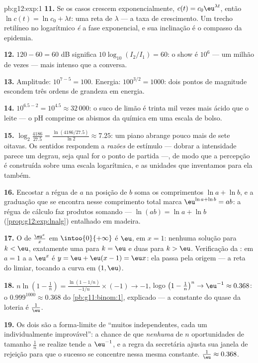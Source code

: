 \begin{solution}{pb:g12:exp:1}
\textbf{11.} Se os casos crescem exponencialmente,
$c(t) = c_0 \eu^{\lambda t}$, então
$\ln c(t) = \ln c_0 + \lambda t$: uma reta de  $\lambda$ --- a taxa de crescimento. Um trecho retilíneo
no  logarítmico \emph{é} a fase exponencial, e sua
inclinação é o compasso da epidemia.

\textbf{12.} $120 - 60 = 60$ dB significa
$10\log_{10}(I_2/I_1) = 60$: o show é $10^6$ --- um milhão de
vezes --- mais intenso que a conversa.

\textbf{13.} Amplitude: $10^{7-5} = 100$. Energia:
$100^{3/2} = 1000$: dois pontos de magnitude escondem três
ordens de grandeza em energia.

\textbf{14.} $10^{6.5 - 2} = 10^{4.5} \approx 32\,000$: o suco
de limão é trinta mil vezes mais ácido que o leite --- o pH
comprime os abismos da química em uma escala de bolso.

\textbf{15.} $\log_2\!\frac{4186}{27.5} =
\frac{\ln(4186/27.5)}{\ln 2} \approx 7.25$: um piano abrange
pouco mais de sete oitavas. Os sentidos respondem a
\emph{razões} de estímulo --- dobrar a intensidade parece um
degrau, seja qual for o ponto de partida ---, de modo que a
percepção é construída sobre uma escala logarítmica, e as
unidades que inventamos para ela também.

\textbf{16.} Encostar a régua de $a$ na posição de $b$ soma os
comprimentos $\ln a + \ln b$, e a graduação que se encontra
nesse comprimento total marca
$\eu^{\ln a + \ln b} = ab$: a régua de cálculo faz produtos
somando  --- $\ln(ab) = \ln a + \ln b$
(\cref{prop:g12:exp:lnalg}) entalhado em madeira.

\textbf{17.} O  de $\frac{\eu^x}{x}$ em
$\intoo{0}{+\infty}$ é $\eu$, em $x = 1$: nenhuma solução para
$k < \eu$, exatamente uma para $k = \eu$ e duas para
$k > \eu$. Verificação da : em $a = 1$ a  a
$\eu^x$ é $y = \eu + \eu(x - 1) = \eu x$: ela passa pela origem
--- a reta do limiar, tocando a curva em $(1, \eu)$.

\textbf{18.} $n \ln\!\left(1 - \frac1n\right) =
\frac{\ln(1 - 1/n)}{-1/n} \times (-1) \to -1$, logo
$\left(1 - \frac1n\right)^n \to \eu^{-1} \approx 0.368$: o
$0.999^{1000} \approx 0.368$ do \cref{pb:g11:binom:1},
explicado --- a constante do quase da loteria é $\frac1\eu$.

\textbf{19.} Os dois são a forma-limite de ``muitos 
independentes, cada um individualmente improvável'': a chance
de que \emph{nenhuma} de $n$ oportunidades de tamanho
$\frac1n$ se realize tende a $\eu^{-1}$, e a regra da
secretária ajusta sua janela de rejeição para que o sucesso se
concentre nessa mesma constante. $\frac1\eu \approx 0.368$.


\end{solution}
